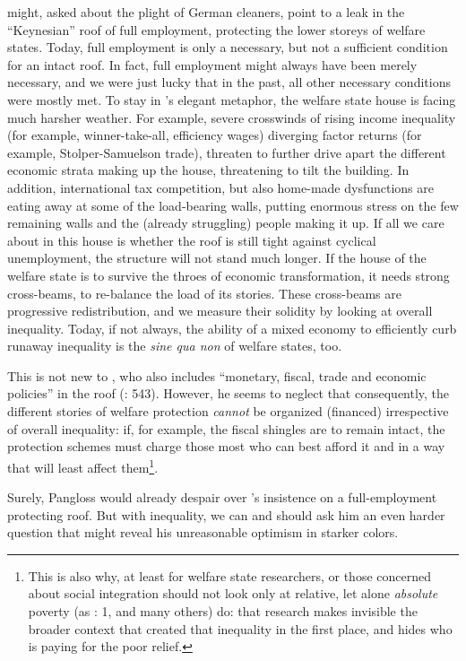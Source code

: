 \begin{enumerate}
	\citeauthor{Offe2003} might, asked about the plight of German cleaners, point to a leak in the ``Keynesian'' roof of full employment, protecting the lower storeys of welfare states. Today, full employment is only a necessary, but not a sufficient condition for an intact roof. In fact, full employment might always have been merely necessary, and we were just lucky that in the past, all other necessary conditions were mostly met. To stay in \citeauthor{Offe2003}'s elegant metaphor, the welfare state house is facing much harsher weather. For example, severe crosswinds of rising income inequality (for example, winner-take-all, efficiency wages) diverging factor returns (for example, Stolper-Samuelson trade), threaten to further drive apart the different economic strata making up the house, threatening to tilt the building. In addition, international tax competition, but also home-made dysfunctions are eating away at some of the load-bearing walls, putting enormous stress on the few remaining walls and the (already struggling) people making it up. If all we care about in this house is whether the roof is still tight against cyclical unemployment, the structure will not stand much longer. If the house of the welfare state is to survive the throes of economic transformation, it needs strong cross-beams, to re-balance the load of its stories. These cross-beams are progressive redistribution, and we measure their solidity by looking at overall inequality. Today, if not always, the ability of a mixed economy to efficiently curb runaway inequality is the \emph{sine qua non} of welfare states, too.

	This is not new to \cite{Offe2003}, who also includes ``monetary, fiscal, trade and economic policies'' in the roof (\citeyear{Offe2003}: 543). However, he seems to neglect that consequently, the different stories of welfare protection \emph{cannot} be organized (financed) irrespective of overall inequality: if, for example, the fiscal shingles are to remain intact, the protection schemes must charge those most who can best afford it and in a way that will least affect them\footnote{
		This is also why, at least for welfare state researchers, or those concerned about social integration should not look only at relative, let alone \emph{absolute} poverty (as \citealt{Grow2005}: 1, and many others) do: that research makes invisible the broader context that created that inequality in the first place, and hides who is paying for the poor relief.}.

	Surely, Pangloss would already despair over \cite{Offe2003}'s insistence on a full-employment protecting roof. But with inequality, we can and should ask him an even harder question that might reveal his unreasonable optimism in starker colors.


\end{enumerate}
